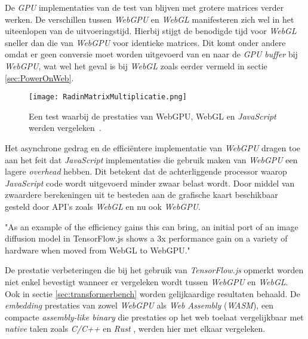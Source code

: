 \bigbreak{}

De \textit{GPU} implementaties van de test van \textcite{Radin2021} blijven met grotere matrices verder werken. De verschillen tussen \textit{WebGPU} en \textit{WebGL} manifesteren zich wel in het uiteenlopen van de uitvoeringstijd. Hierbij stijgt de benodigde tijd voor \textit{WebGL} sneller dan die van \textit{WebGPU} voor identieke matrices. Dit komt onder andere omdat er geen conversie moet worden uitgevoerd van en naar de \textit{GPU buffer} bij \textit{WebGPU}, wat wel het geval is bij \textit{WebGL} zoals eerder vermeld in sectie \ref{sec:PowerOnWeb}. 

\break{}

\begin{figure}
    \texttt{[image: RadinMatrixMultiplicatie.png]}
    \caption[Matrixvermenigvuldiging test~\autocite{Radin2021}]{Een test waarbij de prestaties van WebGPU, WebGL en \textit{JavaScript} werden vergeleken~\autocite{Radin2021}.}
    \label{fig:Matrix Multiplication By Radin}
\end{figure}

Het asynchrone gedrag en de efficiëntere implementatie van \textit{WebGPU} dragen toe aan het feit dat \textit{JavaScript} implementaties die gebruik maken van \textit{WebGPU} een lagere \textit{overhead} hebben. Dit betekent dat de achterliggende processor waarop \textit{JavaScript} code wordt uitgevoerd minder zwaar belast wordt. Door middel van zwaardere berekeningen uit te besteden aan de grafische kaart beschikbaar gesteld door API's zoals \textit{WebGL} en nu ook \textit{WebGPU}.

\begin{displayquote}
    "As an example of the efficiency gains this can bring, an initial port of an image diffusion model in TensorFlow.js shows a 3x performance gain on a variety of hardware when moved from WebGL to WebGPU."
\end{displayquote}

De prestatie verbeteringen die \textcite{Wallez2023} bij het gebruik van \textit{TensorFlow.js} opmerkt worden niet enkel bevestigt wanneer er vergeleken wordt tussen \textit{WebGPU} en \textit{WebGL}. Ook in sectie \ref{sec:transformerbench} worden gelijkaardige resultaten behaald. De \textit{embedding} prestaties van zowel \textit{WebGPU} als \textit{Web Assembly} (\textit{WASM}), een compacte \textit{assembly-like binary} die prestaties op het web toelaat vergelijkbaar met \textit{native} talen zoals \textit{C/C++} en \textit{Rust} \autocite{Steiner2023}, werden hier met elkaar vergeleken.

